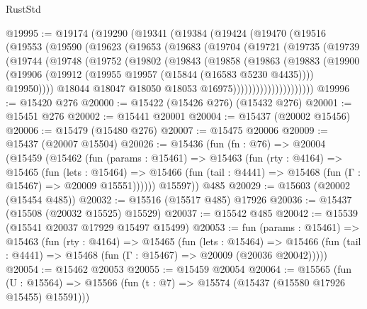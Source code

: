 \begin{lexlean}{RustStd}
\begin{coremodule}
@19995 := @19174
    (@19290
      (@19341
        (@19384
          (@19424
            (@19470
              (@19516
                (@19553
                  (@19590
                    (@19623
                      (@19653
                        (@19683
                          (@19704
                            (@19721
                              (@19735
                                (@19739
                                  (@19744
                                    (@19748
                                      (@19752
                                        (@19802
                                          (@19843
                                            (@19858
                                              (@19863
                                                (@19883
                                                  (@19900
                                                    (@19906
                                                      (@19912
                                                        (@19955
                                                          @19957
                                                          (@15844 (@16583 @5230 @4435))))
                                                      @19950))))
                                              @18044
                                              @18047
                                              @18050
                                              @18053
                                              @16975)))))))))))))))))))))
@19996 := @15420 @276
@20000 := @15422 (@15426 @276) (@15432 @276)
@20001 := @15451 @276
@20002 := @15441 @20001
@20004 := @15437 (@20002 @15456)
@20006 := @15479 (@15480 @276)
@20007 := @15475 @20006
@20009 := @15437 (@20007 @15504)
@20026 := @15436
    (fun (fn : @76) =>
    @20004
      (@15459
        (@15462
          (fun (params : @15461) =>
          @15463
            (fun (rty : @4164) =>
            @15465
              (fun (lets : @15464) =>
              @15466 (fun (tail : @4441) => @15468 (fun (Γ : @15467) => @20009 @15551))))))
        @15597))
    @485
@20029 := @15603 (@20002 (@15454 @485))
@20032 := @15516 (@15517 @485) @17926
@20036 := @15437 (@15508 (@20032 @15525) @15529)
@20037 := @15542 @485
@20042 := @15539 (@15541 @20037 @17929 @15497 @15499)
@20053 := fun (params : @15461) =>
  @15463
    (fun (rty : @4164) =>
    @15465
      (fun (lets : @15464) =>
      @15466 (fun (tail : @4441) => @15468 (fun (Γ : @15467) => @20009 (@20036 @20042)))))
@20054 := @15462 @20053
@20055 := @15459 @20054
@20064 := @15565
    (fun (U : @15564) => @15566 (fun (t : @7) => @15574 (@15437 (@15580 @17926 @15455) @15591)))

\end{coremodule}
\end{lexlean}
